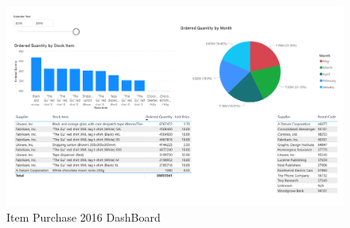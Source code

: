 \documentclass[12pt]{article}
\begin{document}
\begin{figure}[H]
    \centering
    \includegraphics[width=18.5cm, angle=90]
    {images/item Purchase2016.pdf}
    \caption{Item Purchase 2016 DashBoard}
    \label{Item Purchase 2016 DashBoard}
\end{figure}
\end{document}
